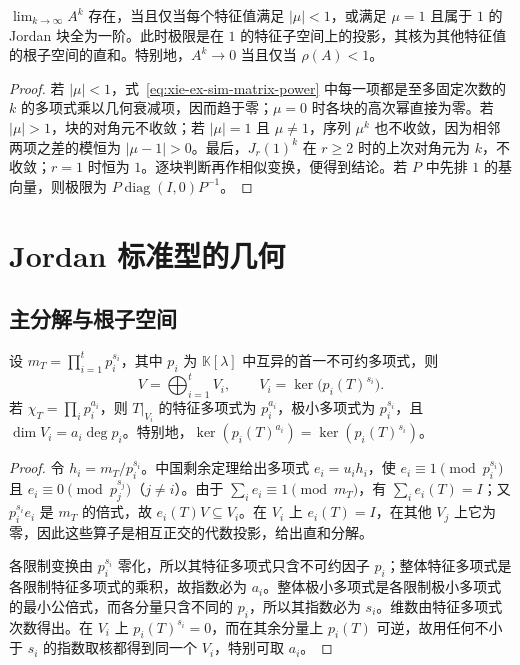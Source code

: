 \begin{theorem}
\label{thm:xie-ex-sim-power-limit}
$\lim_{k\to\infty}A^k$ 存在，当且仅当每个特征值满足 $|\mu|<1$，或满足 $\mu=1$ 且属于 $1$ 的 Jordan 块全为一阶。此时极限是在 $1$ 的特征子空间上的投影，其核为其他特征值的根子空间的直和。特别地，$A^k\to0$ 当且仅当 $\rho(A)<1$。
\end{theorem}
\begin{proof}
若 $|\mu|<1$，式~\eqref{eq:xie-ex-sim-matrix-power} 中每一项都是至多固定次数的 $k$ 的多项式乘以几何衰减项，因而趋于零；$\mu=0$ 时各块的高次幂直接为零。若 $|\mu|>1$，块的对角元不收敛；若 $|\mu|=1$ 且 $\mu\ne1$，序列 $\mu^k$ 也不收敛，因为相邻两项之差的模恒为 $|\mu-1|>0$。最后，$J_r(1)^k$ 在 $r\geq2$ 时的上次对角元为 $k$，不收敛；$r=1$ 时恒为 $1$。逐块判断再作相似变换，便得到结论。若 $P$ 中先排 $1$ 的基向量，则极限为 $P\operatorname{diag}(I,0)P^{-1}$。
\end{proof}

\section{Jordan 标准型的几何}
\label{sec:xie-ex-sim-geometry}

\subsection{主分解与根子空间}

\begin{theorem}[主分解]
\label{thm:xie-ex-sim-primary}
设 $m_T=\prod_{i=1}^{t}p_i^{s_i}$，其中 $p_i$ 为 $\mathbb K[\lambda]$ 中互异的首一不可约多项式，则
\begin{equation}
 V=\bigoplus_{i=1}^{t}V_i,
 \qquad V_i=\ker\bigl(p_i(T)^{s_i}\bigr).
 \label{eq:xie-ex-sim-primary}
\end{equation}
若 $\chi_T=\prod_i p_i^{a_i}$，则 $T|_{V_i}$ 的特征多项式为 $p_i^{a_i}$，极小多项式为 $p_i^{s_i}$，且 $\dim V_i=a_i\deg p_i$。特别地，$\ker(p_i(T)^{a_i})=\ker(p_i(T)^{s_i})$。
\end{theorem}
\begin{proof}
令 $h_i=m_T/p_i^{s_i}$。中国剩余定理给出多项式 $e_i=u_ih_i$，使 $e_i\equiv1\pmod{p_i^{s_i}}$ 且 $e_i\equiv0\pmod{p_j^{s_j}}$（$j\ne i$）。由于 $\sum_i e_i\equiv1\pmod{m_T}$，有 $\sum_i e_i(T)=I$；又 $p_i^{s_i}e_i$ 是 $m_T$ 的倍式，故 $e_i(T)V\subseteq V_i$。在 $V_i$ 上 $e_i(T)=I$，在其他 $V_j$ 上它为零，因此这些算子是相互正交的代数投影，给出直和分解。

各限制变换由 $p_i^{s_i}$ 零化，所以其特征多项式只含不可约因子 $p_i$；整体特征多项式是各限制特征多项式的乘积，故指数必为 $a_i$。整体极小多项式是各限制极小多项式的最小公倍式，而各分量只含不同的 $p_i$，所以其指数必为 $s_i$。维数由特征多项式次数得出。在 $V_i$ 上 $p_i(T)^{s_i}=0$，而在其余分量上 $p_i(T)$ 可逆，故用任何不小于 $s_i$ 的指数取核都得到同一个 $V_i$，特别可取 $a_i$。
\end{proof}

